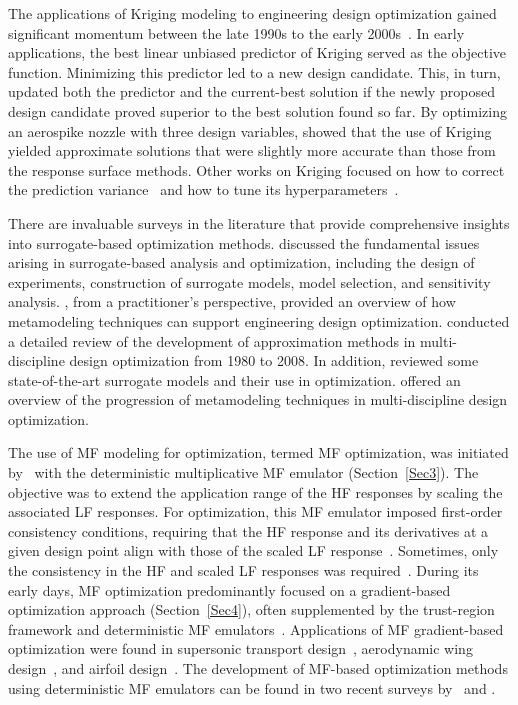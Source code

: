 \documentclass[iicol,sn-basic]{sn-jnl}%
\theoremstyle{thmstyleone}%
\theoremstyle{thmstyletwo}
\theoremstyle{thmstylethree}
\begin{document}
\begin{linenumbers}
The applications of Kriging modeling to engineering design optimization gained significant momentum between the late 1990s to the early 2000s~\citep{Torczon1998,Simpson2001}.
In early applications, the best linear unbiased predictor of Kriging served as the objective function.
Minimizing this predictor led to a new design candidate.
This, in turn, updated both the predictor and the current-best solution if the newly proposed design candidate proved superior to the best solution found so far.
By optimizing an aerospike nozzle with three design variables, \cite{Simpson2001} showed that the use of Kriging yielded approximate solutions that were slightly more accurate than those from the response surface methods.
Other works on Kriging focused on how to correct the prediction variance~\citep{Hertog2006} and how to tune its hyperparameters~\citep{Toal2008}.

There are invaluable surveys in the literature that provide comprehensive insights into surrogate-based optimization methods.
\cite{Queipo2005} discussed the fundamental issues arising in surrogate-based analysis and optimization, including the design of experiments, construction of surrogate models, model selection, and sensitivity analysis.
\cite{Wang2006}, from a practitioner’s perspective, provided an overview of how metamodeling techniques can support engineering design optimization.
\cite{Simpson2008} conducted a detailed review of the development of approximation methods in multi-discipline design optimization from 1980 to 2008.
In addition, \cite{Forrester2009} reviewed some state-of-the-art surrogate models and their use in optimization.
\cite{Viana2014} offered an overview of the progression of metamodeling techniques in multi-discipline design optimization.

The use of MF modeling for optimization, termed MF optimization, was initiated by~\cite{Haftka1991} with the deterministic multiplicative MF emulator (Section~\ref{Sec3}).
The objective was to extend the application range of the HF responses by scaling the associated LF responses.
For optimization, this MF emulator imposed first-order consistency conditions, requiring that the HF response and its derivatives at a given design point align with those of the scaled LF response~\citep{Alexandrov2001}.
Sometimes, only the consistency in the HF and scaled LF responses was required~\citep{Rodriguez2001}.
During its early days, MF optimization predominantly focused on a gradient-based optimization approach (Section~\ref{Sec4}), often supplemented by the trust-region framework and deterministic MF emulators~\citep{Alexandrov1998,Alexandrov2000,Alexandrov2001}.
Applications of MF gradient-based optimization were found in supersonic transport design~\citep{Knill1999}, aerodynamic wing design~\citep{Alexandrov2001}, and airfoil design~\citep{Gano2005}.
The development of MF-based optimization methods using deterministic MF emulators can be found in two recent surveys by~\cite{Viana2014} and \cite{Peherstorfer2018}.


\end{linenumbers}
\end{document}
